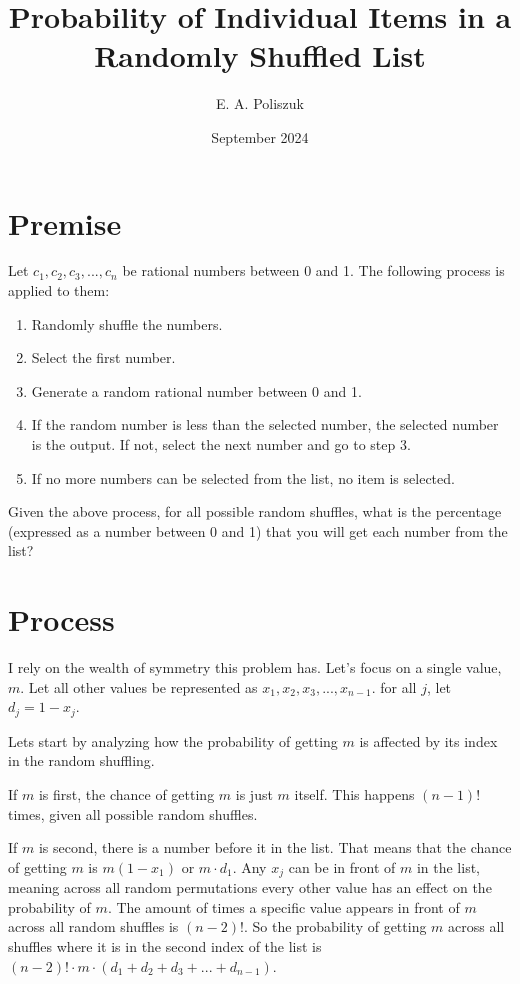 \documentclass{article}
\title{Probability of Individual Items in a Randomly Shuffled List}
\author{E. A. Poliszuk}
\date{September 2024}
\begin{document}
\maketitle

\section{Premise}

Let $c_1, c_2, c_3, ..., c_n$ be rational numbers between 0 and 1. The following process is applied to them:

\begin{enumerate}
    \item Randomly shuffle the numbers.
    \item Select the first number.
    \item Generate a random rational number between 0 and 1.
    \item If the random number is less than the selected number, the selected number is the output. If not, select the next number and go to step 3.
    \item If no more numbers can be selected from the list, no item is selected.
\end{enumerate}

Given the above process, for all possible random shuffles, what is the percentage (expressed as a number between 0 and 1) that you will get each number from the list?

\section{Process}

I rely on the wealth of symmetry this problem has. Let's focus on a single value, $m$.
Let all other values be represented as $x_1, x_2, x_3, ..., x_{n-1}$. for all $j$, let $d_j = 1 - x_j$.

Lets start by analyzing how the probability of getting $m$ is affected by its index in the random shuffling.

If $m$ is first, the chance of getting $m$ is just $m$ itself. This happens $(n - 1)!$ times, given all possible random shuffles.

If $m$ is second, there is a number before it in the list. That means that the chance of getting $m$ is $m(1 - x_1)$ or $m\cdot d_1$. Any $x_j$ can be in front of $m$ in the list, meaning across all random permutations every other value has an effect on the probability of $m$. The amount of times a specific value appears in front of $m$ across all random shuffles is $(n - 2)!$. So the probability of getting $m$ across all shuffles where it is in the second index of the list is $(n - 2)! \cdot m \cdot (d_1 + d_2 + d_3 + ... + d_{n-1})$.
\end{document}
